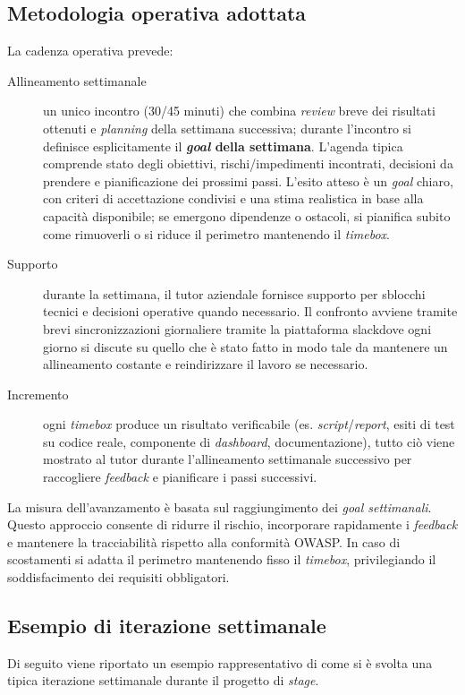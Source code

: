 \subsection{Metodologia operativa adottata}

La cadenza operativa prevede:
\begin{description}
    \item[Allineamento settimanale] un unico incontro (30/45 minuti) che combina \emph{review} breve dei risultati ottenuti e \emph{planning} della settimana successiva; durante l'incontro si definisce esplicitamente il \textbf{\emph{goal} della settimana}. L'agenda tipica comprende stato degli obiettivi, rischi/impedimenti incontrati, decisioni da prendere e pianificazione dei prossimi passi. L'esito atteso è un \emph{goal} chiaro, con criteri di accettazione condivisi e una stima realistica in base alla capacità disponibile; se emergono dipendenze o ostacoli, si pianifica subito come rimuoverli o si riduce il perimetro mantenendo il \emph{timebox}.
    \item[Supporto] durante la settimana, il tutor aziendale fornisce supporto per sblocchi tecnici e decisioni operative quando necessario. Il confronto avviene tramite brevi sincronizzazioni giornaliere tramite la piattaforma \gls{slack}\glsfirstoccur dove ogni giorno si discute su quello che è stato fatto in modo tale da mantenere un allineamento costante e reindirizzare il lavoro se necessario.
    \item[Incremento] ogni \emph{timebox} produce un risultato verificabile (es. \emph{script}/\emph{report}, esiti di test su codice reale, componente di \emph{dashboard}, documentazione), tutto ciò viene mostrato al tutor durante l'allineamento settimanale successivo per raccogliere \emph{feedback} e pianificare i passi successivi.
\end{description}

La misura dell'avanzamento è basata sul raggiungimento dei \emph{goal settimanali}. Questo approccio consente di ridurre il rischio, incorporare rapidamente i \emph{feedback} e mantenere la tracciabilità rispetto alla conformità OWASP. 
In caso di scostamenti si adatta il perimetro mantenendo fisso il \emph{timebox}, privilegiando il soddisfacimento dei requisiti obbligatori. 

\subsection{Esempio di iterazione settimanale}
Di seguito viene riportato un esempio rappresentativo di come si è svolta una tipica iterazione settimanale durante il progetto di \emph{stage}.

